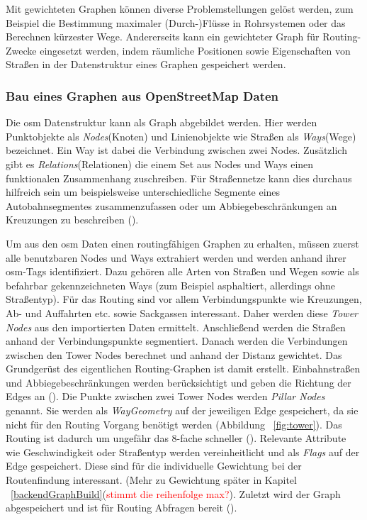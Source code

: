 \documentclass[12pt,a4paper]{article}
\newcommand\todo[1]{\textcolor{red}{#1}}
\begin{document}
Mit gewichteten Graphen können diverse Problemstellungen gelöst werden, zum Beispiel die Bestimmung maximaler (Durch-)Flüsse in Rohrsystemen oder das Berechnen kürzester Wege. Andererseits kann ein gewichteter Graph für Routing-Zwecke eingesetzt werden, indem räumliche Positionen sowie Eigenschaften von Straßen in der Datenstruktur eines Graphen gespeichert werden.

\subsubsection{Bau eines Graphen aus OpenStreetMap Daten}
\label{sec:osmgraph}

Die \gls{osm} Datenstruktur kann als Graph abgebildet werden. Hier werden Punktobjekte als \textit{Nodes}(Knoten) und Linienobjekte wie Straßen als \textit{Ways}(Wege) bezeichnet. Ein Way ist dabei die Verbindung zwischen zwei Nodes. Zusätzlich gibt es \textit{Relations}(Relationen) die einem Set aus Nodes und Ways einen funktionalen Zusammenhang zuschreiben. Für Straßennetze kann dies durchaus hilfreich sein um beispielsweise unterschiedliche Segmente eines Autobahnsegmentes zusammenzufassen oder um Abbiegebeschränkungen an Kreuzungen zu beschreiben (\cite{osmrelation}).

Um aus den \gls{osm} Daten einen routingfähigen Graphen zu erhalten, müssen zuerst alle benutzbaren Nodes und Ways extrahiert werden und werden anhand ihrer \gls{osm}-Tags identifiziert. Dazu gehören alle Arten von Straßen und Wegen sowie als befahrbar gekennzeichneten Ways (zum Beispiel asphaltiert, allerdings ohne Straßentyp). Für das Routing sind vor allem Verbindungspunkte wie Kreuzungen, Ab- und Auffahrten etc. sowie Sackgassen interessant. Daher werden diese \textit{Tower Nodes} aus den importierten Daten ermittelt. Anschließend werden die Straßen anhand der Verbindungspunkte segmentiert. Danach werden die Verbindungen zwischen den Tower Nodes berechnet und anhand der Distanz gewichtet. Das Grundgerüst des eigentlichen Routing-Graphen ist damit erstellt. Einbahnstraßen und Abbiegebeschränkungen werden berücksichtigt und geben die Richtung der Edges an (\cite{osmgraph}). Die Punkte zwischen zwei Tower Nodes werden \textit{Pillar Nodes} genannt. Sie werden als \textit{WayGeometry} auf der jeweiligen Edge gespeichert, da sie nicht für den Routing Vorgang benötigt werden (Abbildung ~\ref{fig:tower}). Das Routing ist dadurch um ungefähr das 8-fache schneller (\cite{graphhopper}). Relevante Attribute wie Geschwindigkeit oder Straßentyp werden vereinheitlicht und als \textit{Flags} auf der Edge gespeichert. Diese sind für die individuelle Gewichtung bei der Routenfindung interessant. (Mehr zu Gewichtung später in Kapitel ~\ref{backendGraphBuild}(\todo{stimmt die reihenfolge max?}). Zuletzt wird der Graph abgespeichert und ist für Routing Abfragen bereit (\cite{osmgraph}). 
\end{document}
